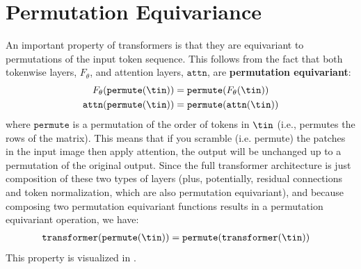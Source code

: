 \section{Permutation Equivariance}
An important property of transformers is that they are equivariant to permutations of the input token sequence. This follows from the fact that both tokenwise layers, $F_{\theta}$, and attention layers, $\texttt{attn}$, are \textbf{permutation equivariant}:
\begin{align}
    F_{\theta}(\texttt{permute}(\tin)) &= \texttt{permute}(F_{\theta}(\tin))\\
    \texttt{attn}(\texttt{permute}(\tin)) &= \texttt{permute}(\texttt{attn}(\tin))
\end{align}
where $\texttt{permute}$ is a permutation of the order of tokens in $\tin$ (i.e., permutes the rows of the matrix). This means that if you scramble (i.e. permute) the patches in the input image then apply attention, the output will be unchanged up to a permutation of the original output. Since the full transformer architecture is just composition of these two types of layers (plus, potentially, residual connections and token normalization, which are also permutation equivariant), and because composing two permutation equivariant functions results in a permutation equivariant operation, we have:
\begin{align}
    \texttt{transformer}(\texttt{permute}(\tin)) &= \texttt{permute}(\texttt{transformer}(\tin))
\end{align}
This property is visualized in \fig{\ref{fig:transformers:permutation_equivariance}}.

